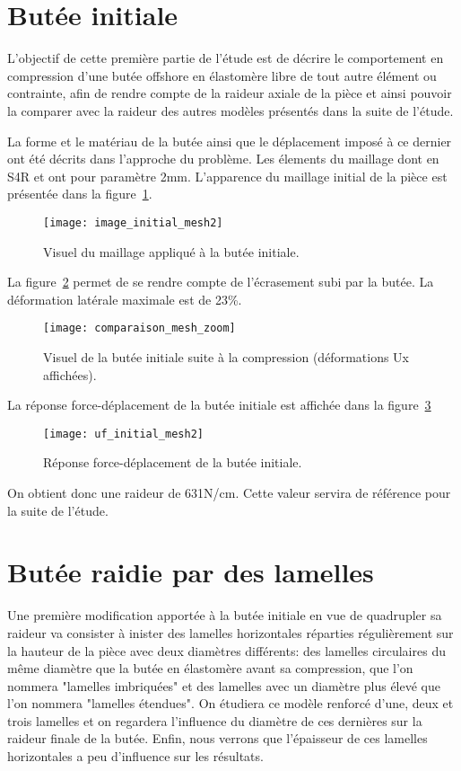 ﻿\documentclass{article}
\newcommand{\cimg}{0.8}
\begin{document}
\section{Butée initiale}

L'objectif de cette première partie de l'étude est de décrire le comportement en compression d'une butée offshore en élastomère libre de tout autre élément ou contrainte, afin de rendre compte de la raideur axiale de la pièce et ainsi pouvoir la comparer avec la raideur des autres modèles présentés dans la suite de l'étude.

La forme et le matériau de la butée ainsi que le déplacement imposé à ce dernier ont été décrits dans l'approche du problème. Les élements du maillage dont en S4R et ont pour paramètre 2mm. L'apparence du maillage initial de la pièce est présentée dans la figure~\ref{fig3}.

\begin{figure}[!h]
	\centering
	\texttt{[image: image\_initial\_mesh2]}
	\caption{Visuel du maillage appliqué à la butée initiale.}
	\label{fig3}
\end{figure}

La figure~\ref{fig4} permet de se rendre compte de l'écrasement subi par la butée. La déformation latérale maximale est de 23\%.

\begin{figure}[!h]
	\centering
	\texttt{[image: comparaison\_mesh\_zoom]}
	\caption{Visuel de la butée initiale suite à la compression (déformations Ux affichées).}
	\label{fig4}
\end{figure}

La réponse force-déplacement de la butée initiale est affichée dans la figure~\ref{fig5}

\begin{figure}[!h]
	\centering
	\texttt{[image: uf\_initial\_mesh2]}
	\caption{Réponse force-déplacement de la butée initiale.}
	\label{fig5}
\end{figure}

On obtient donc une raideur de 631N/cm. Cette valeur servira de référence pour la suite de l'étude.


\section{Butée raidie par des lamelles}

Une première modification apportée à la butée initiale en vue de quadrupler sa raideur va consister à inister des lamelles horizontales réparties régulièrement sur la hauteur de la pièce avec deux diamètres différents: des lamelles circulaires du même diamètre que la butée en élastomère avant sa compression, que l'on nommera "lamelles imbriquées" et des lamelles avec un diamètre plus élevé que l'on nommera "lamelles étendues". On étudiera ce modèle renforcé d'une, deux et trois lamelles et on regardera l'influence du diamètre de ces dernières sur la raideur finale de la butée. Enfin, nous verrons que l'épaisseur de ces lamelles horizontales a peu d'influence sur les résultats.
\end{document}
